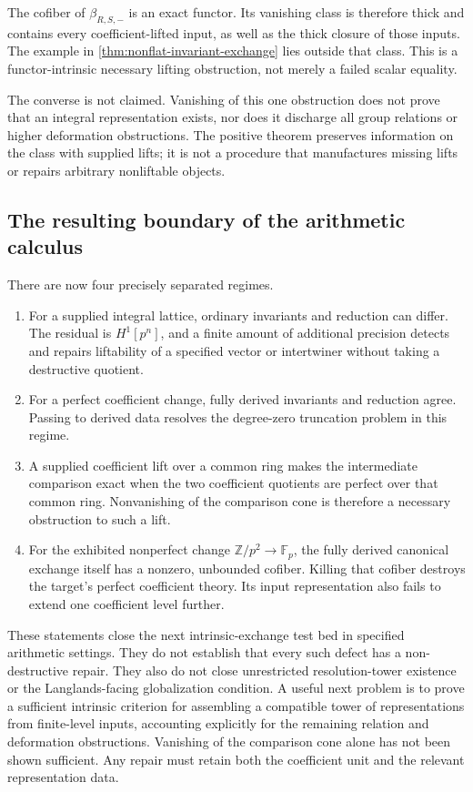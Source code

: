 \documentclass[11pt]{article}
\theoremstyle{definition}
\theoremstyle{remark}
\begin{document}
The cofiber of $\beta_{R,S,-}$ is an exact functor. Its vanishing class is therefore thick and contains every coefficient-lifted input, as well as the thick closure of those inputs. The example in \cref{thm:nonflat-invariant-exchange} lies outside that class. This is a functor-intrinsic necessary lifting obstruction, not merely a failed scalar equality.

The converse is not claimed. Vanishing of this one obstruction does not prove that an integral representation exists, nor does it discharge all group relations or higher deformation obstructions. The positive theorem preserves information on the class with supplied lifts; it is not a procedure that manufactures missing lifts or repairs arbitrary nonliftable objects.

\subsection{The resulting boundary of the arithmetic calculus}

There are now four precisely separated regimes.
\begin{enumerate}
\item For a supplied integral lattice, ordinary invariants and reduction can differ. The residual is $H^1[p^n]$, and a finite amount of additional precision detects and repairs liftability of a specified vector or intertwiner without taking a destructive quotient.
\item For a perfect coefficient change, fully derived invariants and reduction agree. Passing to derived data resolves the degree-zero truncation problem in this regime.
\item A supplied coefficient lift over a common ring makes the intermediate comparison exact when the two coefficient quotients are perfect over that common ring. Nonvanishing of the comparison cone is therefore a necessary obstruction to such a lift.
\item For the exhibited nonperfect change $\mathbb Z/p^2\to\mathbb F_p$, the fully derived canonical exchange itself has a nonzero, unbounded cofiber. Killing that cofiber destroys the target's perfect coefficient theory. Its input representation also fails to extend one coefficient level further.
\end{enumerate}
These statements close the next intrinsic-exchange test bed in specified arithmetic settings. They do not establish that every such defect has a non-destructive repair. They also do not close unrestricted resolution-tower existence or the Langlands-facing globalization condition. A useful next problem is to prove a sufficient intrinsic criterion for assembling a compatible tower of representations from finite-level inputs, accounting explicitly for the remaining relation and deformation obstructions. Vanishing of the comparison cone alone has not been shown sufficient. Any repair must retain both the coefficient unit and the relevant representation data.
\end{document}
